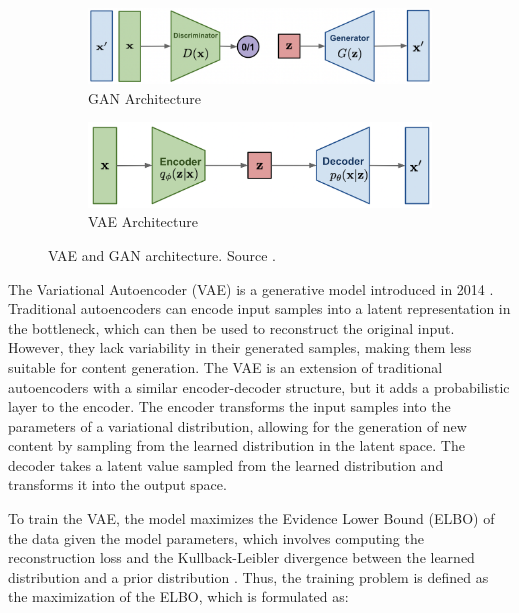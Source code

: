 \begin{figure}
    \centering
    \begin{subfigure}[b]{0.9\columnwidth}
    \includegraphics[width=\columnwidth]{img/2-related-work/gan-design.png}
        \caption{GAN Architecture}
        \label{fig:gan}
      \end{subfigure}

  
  \begin{subfigure}[b]{0.9\columnwidth}
    \includegraphics[width=\columnwidth]{img/2-related-work/vae-design.png}
    \caption{VAE Architecture}
    \label{fig:Vae}
  \end{subfigure}
    \caption[VAE and GAN architecture]{VAE and GAN architecture. Source \cite{lilianweng}.}
    \label{fig:gan-vae}
\end{figure}


The Variational Autoencoder (VAE) is a generative model introduced in 2014 \cite{Kingma2014}. Traditional autoencoders can encode input samples into a latent representation in the bottleneck, which can then be used to reconstruct the original input. However, they lack variability in their generated samples, making them less suitable for content generation. The VAE is an extension of traditional autoencoders with a similar encoder-decoder structure, but it adds a probabilistic layer to the encoder. The encoder transforms the input samples into the parameters of a variational distribution, allowing for the generation of new content by sampling from the learned distribution in the latent space. The decoder takes a latent value sampled from the learned distribution and transforms it into the output space.

To train the VAE, the model maximizes the Evidence Lower Bound (ELBO) of the data given the model parameters, which involves computing the reconstruction loss and the Kullback-Leibler divergence between the learned distribution and a prior distribution \cite{Asperti2021}. Thus, the training problem is defined as the maximization of the ELBO, which is formulated as:


